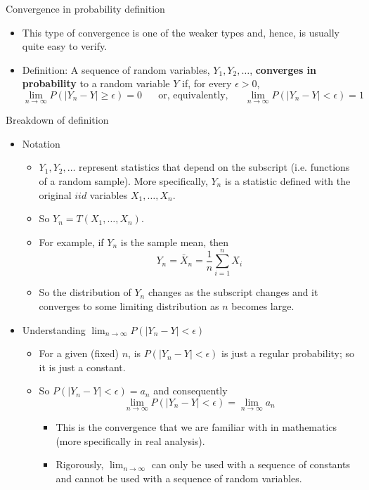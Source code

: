 \documentclass{article}
\newcommand{\vecn}[2]{#1_1, \ldots, #1_{#2}}	%
\begin{document}
Convergence in probability definition\bigskip
\begin{itemize}
    \item This type of convergence is one of the weaker types and, hence, is usually quite easy to verify.
    \item Definition: A sequence of random variables, $Y_1, Y_2, \dots$, \textbf{converges in probability} to a random variable $Y$ if, for every $\epsilon > 0$,
    \[\lim_{n \to \infty} P(\lvert Y_n - Y \rvert \ge \epsilon) = 0 \hspace{20pt} \text{or, equivalently,} \hspace{20pt} \lim_{n \to \infty} P(\lvert Y_n - Y \rvert < \epsilon) = 1\]
\end{itemize}\bigskip

Breakdown of definition
\begin{itemize}
    \item Notation
    \begin{itemize}
        \item $Y_1, Y_2, \ldots$ represent statistics that depend on the subscript (i.e. functions of a random sample). More specifically, $Y_n$ is a statistic defined with the original $iid$ variables $\vecn{X}{n}$.
        \item So $Y_n = T(\vecn{X}{n})$.
        \item[] For example, if $Y_n$ is the sample mean, then 
        \[Y_n = \bar{X}_n = \frac{1}{n} \sum_{i = 1}^n X_i\]
        \item So the distribution of $Y_n$ changes as the subscript changes and it converges to some limiting distribution as $n$ becomes large.
    \end{itemize}\bigskip\newpage
    \item Understanding $\displaystyle \lim_{n \to \infty} P(\lvert Y_n - Y \rvert < \epsilon)$
    \begin{itemize}
        \item For a given (fixed) $n$, is $P(\lvert Y_n - Y \rvert < \epsilon)$ is just a regular probability; so it is just a constant.
        \item So $P(\lvert Y_n - Y \rvert < \epsilon) = a_n$ and consequently
        \[\lim_{n \to \infty} P(\lvert Y_n - Y \rvert < \epsilon) = \lim_{n \to \infty} a_n\]
        \begin{itemize}
            \item This is the convergence that we are familiar with in mathematics (more specifically in real analysis).
            \item Rigorously, $\displaystyle \lim_{n \to \infty}$ can only be used with a sequence of constants and cannot be used with a sequence of random variables.

\end{itemize}
\end{itemize}
\end{itemize}
\end{document}
